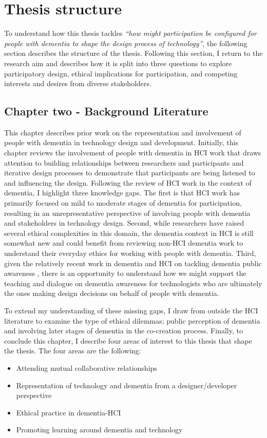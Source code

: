 \section{Thesis structure}
\label{Intro: Thesis structure}
To understand how this thesis tackles \textit{``how might participation be configured for people with dementia to shape the design process of technology''}, the following section describes the structure of the thesis. Following this section, I return to the research aim and describes how it is split into three questions to explore participatory design, ethical implications for participation, and competing interests and desires from diverse stakeholders. 


\subsection{Chapter two - Background Literature}
\label{Intro:ChapterTwo}
This chapter describes prior work on the representation and involvement of people with dementia in technology design and development. Initially, this chapter reviews the involvement of people with dementia in HCI work that draws attention to building relationships between researchers and participants and iterative design processes to demonstrate that participants are being listened to and influencing the design. Following the review of HCI work in the context of dementia, I highlight three knowledge gaps. The first is that HCI work has primarily focused on mild to moderate stages of dementia for participation, resulting in an unrepresentative perspective of involving people with dementia and stakeholders in technology design. Second, while researchers have raised several ethical complexities in this domain, the dementia context in HCI is still somewhat new and could benefit from reviewing non-HCI dementia work to understand their everyday ethics for working with people with dementia. Third, given the relatively recent work in dementia and HCI on tackling dementia public awareness \citep{lazar_safe_2019,talbot_how_2020}, there is an opportunity to understand how we might support the teaching and dialogue on dementia awareness for technologists who are ultimately the ones making design decisions on behalf of people with dementia.  

To extend my understanding of these missing gaps, I draw from outside the HCI literature to examine the type of ethical dilemmas; public perception of dementia and involving later stages of dementia in the co-creation process. Finally, to conclude this chapter, I describe four areas of interest to this thesis that shape the thesis. The four areas are the following: 
\begin{itemize}
    \item Attending mutual collaborative relationships
    \item Representation of technology and dementia from a designer/developer perspective
    \item Ethical practice in dementia-HCI
    \item Promoting learning around dementia and technology
\end{itemize}

